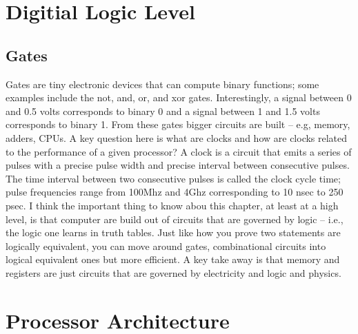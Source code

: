 \documentclass{amsbook}
\begin{document}
\section{Digitial Logic Level}
\subsection{Gates}

Gates are tiny electronic devices that can compute binary functions; some examples include the not, and, or, and xor gates. Interestingly, a signal between 0 and 0.5 volts corresponds to binary 0 and a signal between 1 and 1.5 volts corresponds to binary 1. From these gates bigger circuits are built -- e.g, memory, adders, CPUs. A key question here is what are clocks and how are clocks related to the performance of a given processor? A clock is a circuit that emits a series of pulses with a precise pulse width and precise interval between consecutive pulses. The time interval between two consecutive pulses is called the clock cycle time; pulse frequencies range from 100Mhz and 4Ghz corresponding to 10 nsec to 250 psec. I think the important thing to know abou this chapter, at least at a high level, is that computer are build out of circuits that are governed by logic -- i.e., the logic one learns in truth tables. Just like how you prove two statements are logically equivalent, you can move around gates, combinational circuits into logical equivalent ones but more efficient. A key take away is that memory and registers are just circuits that are governed by electricity and logic and physics.

\section{Processor Architecture}
\end{document}
